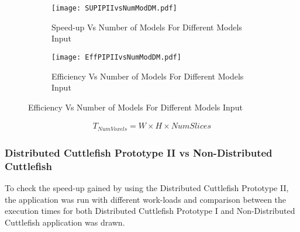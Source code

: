 \begin{figure}
\centering
\captionsetup[subfigure]{labelformat=empty}
\begin{subfigure}
\centering
\texttt{[image: SUPIPIIvsNumModDM.pdf]}
\caption{Speed-up Vs Number of Models For Different Models Input}
\label{fig:SUPIPIIvsNumModDM}
\end{subfigure}
\begin{subfigure}
\centering
\texttt{[image: EffPIPIIvsNumModDM.pdf]}
\caption{Efficiency Vs Number of Models For Different Models Input}
\label{fig:EffPIPIIvsNumModDM}
\end{subfigure}
\end{figure}


\begin{equation}
\label{eq:NumVoxel}
\begin{aligned}
T_{NumVoxels} = W \times H \times NumSlices
\end{aligned}
\end{equation}


\subsubsection{Distributed Cuttlefish Prototype II vs Non-Distributed Cuttlefish}
To check the speed-up gained by using the Distributed Cuttlefish Prototype II, the application was run with different work-loads and comparison between the execution times for both Distributed Cuttlefish Prototype I and Non-Distributed Cuttlefish application was drawn.

